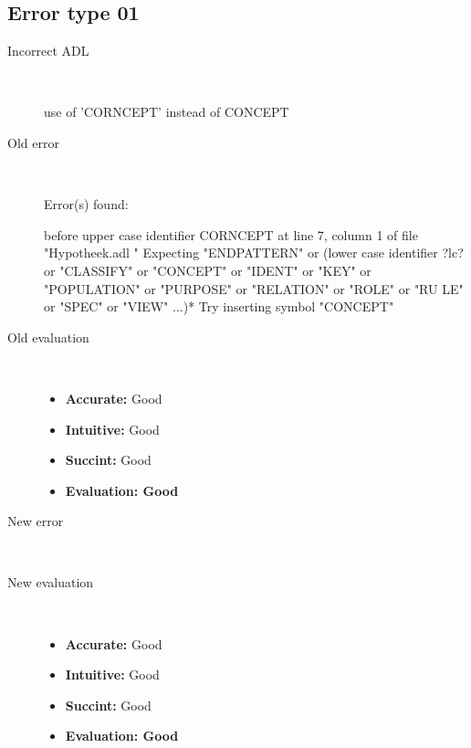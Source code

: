 \subsection{Error type 01}
  \begin{description}
  \item[Incorrect ADL]~\\
\begin{adl}
use of 'CORNCEPT' instead of CONCEPT\end{adl}
  \item[Old error]~\\
\begin{haskell}
Error(s) found:

before upper case identifier CORNCEPT at line 7, column 1 of file "Hypotheek.adl
"
Expecting "ENDPATTERN" or (lower case identifier ?lc? or "CLASSIFY" or "CONCEPT"
 or "IDENT" or "KEY" or "POPULATION" or "PURPOSE" or "RELATION" or "ROLE" or "RU
LE" or "SPEC" or "VIEW" ...)*
Try inserting symbol "CONCEPT"\end{haskell}
  \item[Old evaluation]~\\
    \begin{itemize}
    \item \textbf{Accurate:} Good
    \item \textbf{Intuitive:} Good
    \item \textbf{Succint:} Good
    \item \textbf{Evaluation: Good}
    \end{itemize}
  \item[New error]~\\
\begin{haskell}
\end{haskell}
  \item[New evaluation]~\\
    \begin{itemize}
    \item \textbf{Accurate:} Good
    \item \textbf{Intuitive:} Good
    \item \textbf{Succint:} Good
    \item \textbf{Evaluation: Good
}
    \end{itemize}
  \end{description}

